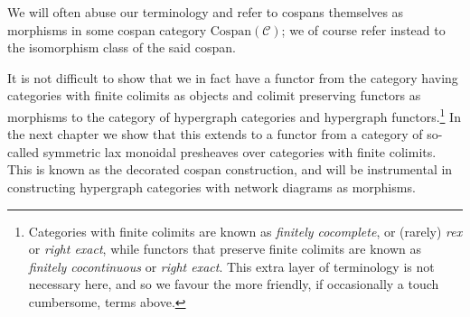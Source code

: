 We will often abuse our terminology and refer to cospans themselves as
morphisms in some cospan category $\mathrm{Cospan}(\mathcal C)$; we of course
refer instead to the isomorphism class of the said cospan.

It is not difficult to show that we in fact have a functor from the category
having categories with finite colimits as objects and colimit preserving
functors as morphisms to the category of hypergraph categories and hypergraph
functors.\footnote{Categories with finite colimits are known as \emph{finitely
cocomplete}, or (rarely) \emph{rex} or \emph{right exact}, while functors that
preserve finite colimits are known as \emph{finitely cocontinuous} or
\emph{right exact}. This extra layer of terminology is not necessary here, and
so we favour the more friendly, if occasionally a touch cumbersome, terms
above.} In the next chapter we show that this extends to a functor from a
category of so-called symmetric lax monoidal presheaves over categories with
finite colimits. This is known as the decorated cospan construction, and will
be instrumental in constructing hypergraph categories with network diagrams as
morphisms.






